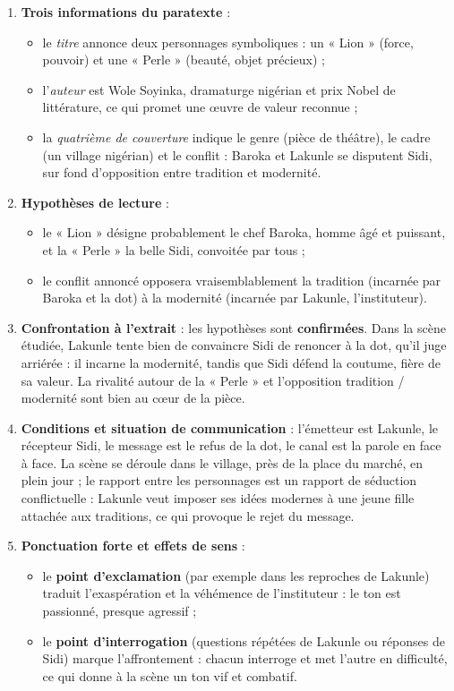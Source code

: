 \documentclass[11pt]{article}
\begin{document}
\begin{corrige}
\begin{enumerate}
\item \textbf{Trois informations du paratexte} :
\begin{itemize}
\item le \emph{titre} annonce deux personnages symboliques : un « Lion » (force, pouvoir) et une « Perle » (beauté, objet précieux) ;
\item l'\emph{auteur} est Wole Soyinka, dramaturge nigérian et prix Nobel de littérature, ce qui promet une œuvre de valeur reconnue ;
\item la \emph{quatrième de couverture} indique le genre (pièce de théâtre), le cadre (un village nigérian) et le conflit : Baroka et Lakunle se disputent Sidi, sur fond d'opposition entre tradition et modernité.
\end{itemize}
\item \textbf{Hypothèses de lecture} :
\begin{itemize}
\item le « Lion » désigne probablement le chef Baroka, homme âgé et puissant, et la « Perle » la belle Sidi, convoitée par tous ;
\item le conflit annoncé opposera vraisemblablement la tradition (incarnée par Baroka et la dot) à la modernité (incarnée par Lakunle, l'instituteur).
\end{itemize}
\item \textbf{Confrontation à l'extrait} : les hypothèses sont \textbf{confirmées}. Dans la scène étudiée, Lakunle tente bien de convaincre Sidi de renoncer à la dot, qu'il juge arriérée : il incarne la modernité, tandis que Sidi défend la coutume, fière de sa valeur. La rivalité autour de la « Perle » et l'opposition tradition / modernité sont bien au cœur de la pièce.
\item \textbf{Conditions et situation de communication} : l'émetteur est Lakunle, le récepteur Sidi, le message est le refus de la dot, le canal est la parole en face à face. La scène se déroule dans le village, près de la place du marché, en plein jour ; le rapport entre les personnages est un rapport de séduction conflictuelle : Lakunle veut imposer ses idées modernes à une jeune fille attachée aux traditions, ce qui provoque le rejet du message.
\item \textbf{Ponctuation forte et effets de sens} :
\begin{itemize}
\item le \textbf{point d'exclamation} (par exemple dans les reproches de Lakunle) traduit l'exaspération et la véhémence de l'instituteur : le ton est passionné, presque agressif ;
\item le \textbf{point d'interrogation} (questions répétées de Lakunle ou réponses de Sidi) marque l'affrontement : chacun interroge et met l'autre en difficulté, ce qui donne à la scène un ton vif et combatif.
\end{itemize}
\end{enumerate}


\end{corrige}
\end{document}
